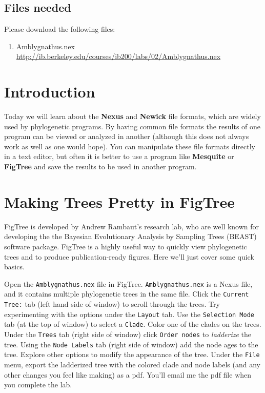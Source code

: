 \documentclass[11pt]{article}
\begin{document}
\subsection{Files needed}

Please download the following files:
\begin{enumerate}
    \item Amblygnathus.nex \url{http://ib.berkeley.edu/courses/ib200/labs/02/Amblygnathus.nex}
\end{enumerate}


\section{Introduction}

Today we will learn about the \textbf{Nexus} and \textbf{Newick} file formats, which are widely used
by phylogenetic programs. 
By having common file formats the results of one program can be viewed or analyzed in another (although this does not always work as well as one would hope). 
You can manipulate these file formats directly in a text editor, 
but often it is better to use a program like \textbf{Mesquite} or \textbf{FigTree} and save the results to be used in another program.


\section{Making Trees Pretty in FigTree}

FigTree is developed by Andrew Rambaut's research lab, who are well known for developing the 
the Bayesian Evolutionary Analysis by Sampling Trees (BEAST) software package. 
FigTree is a highly useful way to quickly view phylogenetic trees and to
produce publication-ready figures. Here we'll just cover some quick basics.

Open the \texttt{Amblygnathus.nex} file in FigTree. \texttt{Amblygnathus.nex} is a Nexus
file, and it contains multiple phylogenetic trees in the same file. 
Click the \texttt{Current Tree:} tab (left hand side of window) to scroll through the trees.
Try experimenting with the options under the \texttt{Layout} tab. Use the \texttt{Selection Mode} tab 
(at the top of window) to select a \texttt{Clade}. Color one of the clades on the trees.
Under the \texttt{Trees} tab (right side of window) click \texttt{Order nodes} to \textit{ladderize}
the tree.
Using the \texttt{Node Labels} tab (right side of window) add the node ages to the tree.
Explore other options to modify the appearance of the tree.
Under the \texttt{File} menu, export the ladderized tree with the colored clade and node labels 
(and any other changes you feel like making) as a pdf. 
You'll email me the pdf file when you complete the lab.
\end{document}
